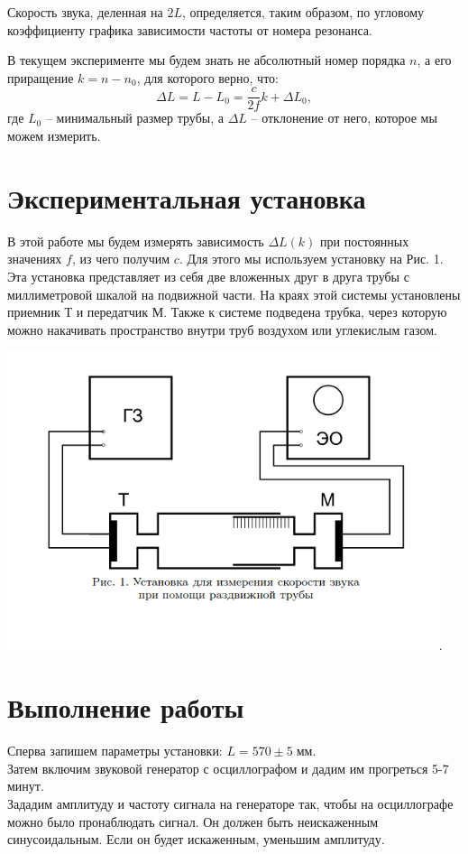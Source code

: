\documentclass[12pt,a4paper]{article}
\begin{document}
Скорость звука, деленная на $2L$, определяется, таким образом, по угловому коэффициенту графика зависимости частоты от номера резонанса.

В текущем эксперименте мы будем знать не абсолютный номер порядка $n$, а его приращение $k = n - n_0$, для которого верно, что:
$$\Delta L = L - L_0 = \frac{c}{2f}k + \Delta L_0,$$
где $L_0$ -- минимальный размер трубы, а $\Delta L$ -- отклонение от него, которое мы можем измерить.


\section{Экспериментальная установка}
В этой работе мы будем измерять зависимость $\Delta L(k)$ при постоянных значениях $f$, из чего получим $c$. Для этого мы используем установку на Рис. 1. Эта установка представляет из себя две вложенных друг в друга трубы с миллиметровой шкалой на подвижной части. На краях этой системы установлены приемник Т и передатчик М. Также к системе подведена трубка, через которую можно накачивать пространство внутри труб воздухом или углекислым газом.
\begin{center}
\includegraphics[width=0.95\textwidth]{equip.png}.
\end{center}


\section{Выполнение работы}


Сперва запишем параметры установки:
$L = 570\pm5 \; {мм}.$\\

Затем включим звуковой генератор с осциллографом и дадим им прогреться 5-7 минут.\\
Зададим амплитуду и частоту сигнала на генераторе так, чтобы на осциллографе можно было пронаблюдать сигнал. Он должен быть неискаженным синусоидальным. Если он будет искаженным, уменьшим амплитуду.\\
\end{document}
